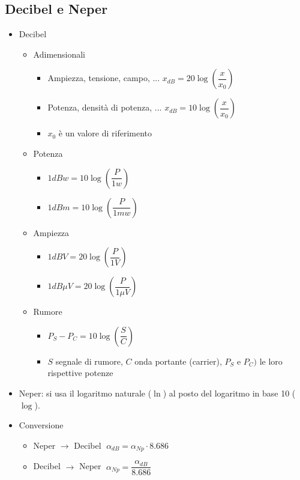 \documentclass{article}
\begin{document}
\subsection{Decibel e Neper}
\begin{itemize}
	\item Decibel
	\begin{itemize}
		\item Adimensionali
		\begin{itemize}
			\item Ampiezza, tensione, campo, ... \( x_{dB} = 20 \log\left(\dfrac{x}{x_0}\right) \)
			\item Potenza, densità di potenza, ... \( x_{dB} = 10 \log\left(\dfrac{x}{x_0}\right) \)
			\item \(x_0\) è un valore di riferimento
		\end{itemize}
		\item Potenza 
		\begin{itemize}
			\item \(1 dBw = 10 \log\left(\dfrac{P}{1w}\right) \)
			\item \(1 dBm = 10 \log\left(\dfrac{P}{1mw}\right) \)
		\end{itemize}
		\item Ampiezza 
		\begin{itemize}
			\item \(1 dBV = 20 \log\left(\dfrac{P}{1V}\right) \)
			\item \(1 dB \mu V = 20 \log\left(\dfrac{P}{1 \mu V}\right) \)
		\end{itemize}
		\item Rumore
		\begin{itemize}
			\item \(P_S - P_C = 10 \log\left( \dfrac{S}{C} \right) \)
			\item \(S\) segnale di rumore, \(C\) onda portante (carrier), \(P_S\) e \(P_C)\) le loro rispettive potenze
		\end{itemize}
	\end{itemize}
	\item Neper: si usa il logaritmo naturale (\( \ln \)) al posto del logaritmo in base 10 (\(\log\)).
	\item Conversione
	\begin{itemize}
		\item Neper \(\rightarrow\) Decibel \( \; \alpha_{dB} = \alpha_{Np} \cdot 8.686 \)
		\item Decibel \(\rightarrow\) Neper \( \; \alpha_{Np} = \dfrac{\alpha_{dB}}{8.686} \)
	\end{itemize}
\end{itemize}
\end{document}
